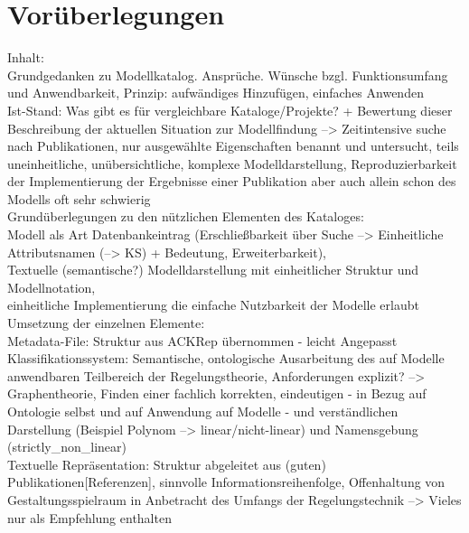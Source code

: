 \chapter{Vorüberlegungen} %
Inhalt:\\
Grundgedanken zu Modellkatalog. Ansprüche. Wünsche bzgl. Funktionsumfang und Anwendbarkeit, Prinzip: aufwändiges Hinzufügen, einfaches Anwenden \\
Ist-Stand: Was gibt es für vergleichbare Kataloge/Projekte? + Bewertung dieser\\
Beschreibung der aktuellen Situation zur Modellfindung --> Zeitintensive suche nach Publikationen, nur ausgewählte Eigenschaften benannt und untersucht, teils uneinheitliche, unübersichtliche, komplexe Modelldarstellung, Reproduzierbarkeit der Implementierung der Ergebnisse einer Publikation aber auch allein schon des Modells oft sehr schwierig \\
Grundüberlegungen zu den nützlichen Elementen des Kataloges: \\ Modell als Art Datenbankeintrag (Erschließbarkeit über Suche --> Einheitliche Attributsnamen (--> KS) + Bedeutung, Erweiterbarkeit), \\ Textuelle (semantische?) Modelldarstellung mit einheitlicher Struktur und Modellnotation, \\einheitliche Implementierung die einfache Nutzbarkeit der Modelle erlaubt \\
Umsetzung der einzelnen Elemente: \\
Metadata-File: Struktur aus ACKRep übernommen - leicht Angepasst \\
Klassifikationssystem: Semantische, ontologische Ausarbeitung des auf Modelle anwendbaren Teilbereich der Regelungstheorie, Anforderungen explizit? --> Graphentheorie, Finden einer fachlich korrekten, eindeutigen - in Bezug auf Ontologie selbst und auf Anwendung auf Modelle - und verständlichen Darstellung (Beispiel Polynom --> linear/nicht-linear) und Namensgebung (strictly\_non\_linear)\\ 
Textuelle Repräsentation: Struktur abgeleitet aus (guten) Publikationen[Referenzen], sinnvolle Informationsreihenfolge, Offenhaltung von Gestaltungsspielraum in Anbetracht des Umfangs der Regelungstechnik --> Vieles nur als Empfehlung enthalten \\ 


